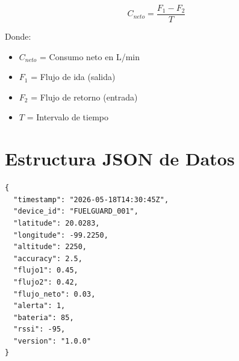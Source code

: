 \documentclass[12pt,a4paper,oneside]{report}
\begin{document}
$$C_{neto} = \frac{F_1 - F_2}{T}$$

Donde:
\begin{itemize}
    \item $C_{neto}$ = Consumo neto en L/min
    \item $F_1$ = Flujo de ida (salida)
    \item $F_2$ = Flujo de retorno (entrada)
    \item $T$ = Intervalo de tiempo
\end{itemize}

\section{Estructura JSON de Datos}

\begin{lstlisting}
{
  "timestamp": "2026-05-18T14:30:45Z",
  "device_id": "FUELGUARD_001",
  "latitude": 20.0283,
  "longitude": -99.2250,
  "altitude": 2250,
  "accuracy": 2.5,
  "flujo1": 0.45,
  "flujo2": 0.42,
  "flujo_neto": 0.03,
  "alerta": 1,
  "bateria": 85,
  "rssi": -95,
  "version": "1.0.0"
}
\end{lstlisting}
\end{document}
